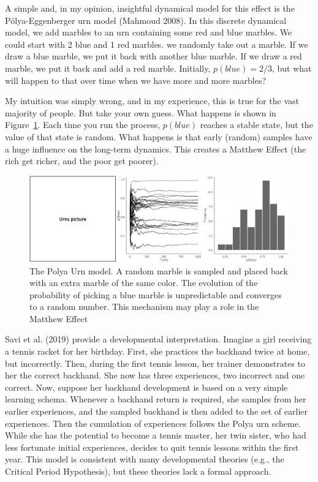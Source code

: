 \documentclass[
  a4paper,
  DIV=11,
  numbers=noendperiod]{scrreprt}
\begin{document}
A simple and, in my opinion, insightful dynamical model for this effect
is the Pólya-Eggenberger urn model (Mahmoud 2008). In this discrete
dynamical model, we add marbles to an urn containing some red and blue
marbles. We could start with 2 blue and 1 red marbles. we randomly take
out a marble. If we draw a blue marble, we put it back with another blue
marble. If we draw a red marble, we put it back and add a red marble.
Initially, \(p(blue) = 2/3\), but what will happen to that over time
when we have more and more marbles?

My intuition was simply wrong, and in my experience, this is true for
the vast majority of people. But take your own guess. What happens is
shown in Figure~\ref{fig-ch4n-img12-old-60}. Each time you run the
process, \(p(blue)\) reaches a stable state, but the value of that state
is random. What happens is that early (random) samples have a huge
influence on the long-term dynamics. This creates a Matthew Effect (the
rich get richer, and the poor get poorer).

\begin{figure}

{\centering \includegraphics{media/ch4n/fig-ch4n-img12-old-60.png}

}

\caption{\label{fig-ch4n-img12-old-60}The Polya Urn model. A random
marble is sampled and placed back with an extra marble of the same
color. The evolution of the probability of picking a blue marble is
unpredictable and converges to a random number. This mechanism may play
a role in the Matthew Effect}

\end{figure}

Savi et al. (2019) provide a developmental interpretation. Imagine a
girl receiving a tennis racket for her birthday. First, she practices
the backhand twice at home, but incorrectly. Then, during the first
tennis lesson, her trainer demonstrates to her the correct backhand. She
now has three experiences, two incorrect and one correct. Now, suppose
her backhand development is based on a very simple learning schema.
Whenever a backhand return is required, she samples from her earlier
experiences, and the sampled backhand is then added to the set of
earlier experiences. Then the cumulation of experiences follows the
Polya urn scheme. While she has the potential to become a tennis master,
her twin sister, who had less fortunate initial experiences, decides to
quit tennis lessons within the first year. This model is consistent with
many developmental theories (e.g., the Critical Period Hypothesis), but
these theories lack a formal approach.
\end{document}
